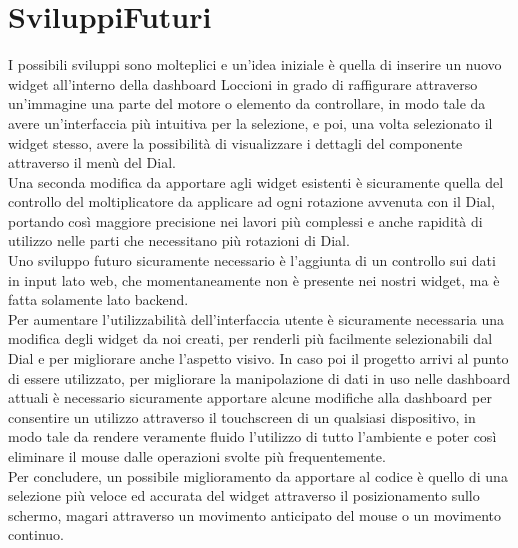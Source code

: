 \chapter{SviluppiFuturi}
\label{chap:Capitolo1}

I possibili sviluppi sono molteplici e un’idea iniziale è quella di inserire un nuovo widget all’interno della dashboard Loccioni in grado di raffigurare attraverso un’immagine una parte del motore o elemento da controllare, in modo tale da avere un’interfaccia più intuitiva per la selezione, e poi, una volta selezionato il widget stesso, avere la possibilità di visualizzare i dettagli del componente attraverso il menù del Dial.\\
Una seconda modifica da apportare agli widget esistenti è sicuramente quella del controllo del moltiplicatore da applicare ad ogni rotazione avvenuta con il Dial, portando così maggiore precisione nei lavori più complessi e anche rapidità di utilizzo nelle parti che necessitano più rotazioni di Dial.\\
Uno sviluppo futuro sicuramente necessario è l’aggiunta di un controllo sui dati in input lato web, che momentaneamente non è presente nei nostri widget, ma è fatta solamente lato backend.\\
Per aumentare l’utilizzabilità dell’interfaccia utente è sicuramente necessaria una modifica degli widget da noi creati, per renderli più facilmente selezionabili dal Dial e per migliorare anche l’aspetto visivo.
In caso poi il progetto arrivi al punto di essere utilizzato, per migliorare la manipolazione di dati in uso nelle dashboard attuali è necessario sicuramente apportare alcune modifiche alla dashboard per consentire un utilizzo attraverso il touchscreen di un qualsiasi dispositivo, in modo tale da rendere veramente fluido l’utilizzo di tutto l’ambiente e poter così eliminare il mouse dalle operazioni svolte più frequentemente.\\
Per concludere, un possibile miglioramento da apportare al codice è quello di una selezione più veloce ed accurata del widget attraverso il posizionamento sullo schermo, magari attraverso un movimento anticipato del mouse o un movimento continuo.